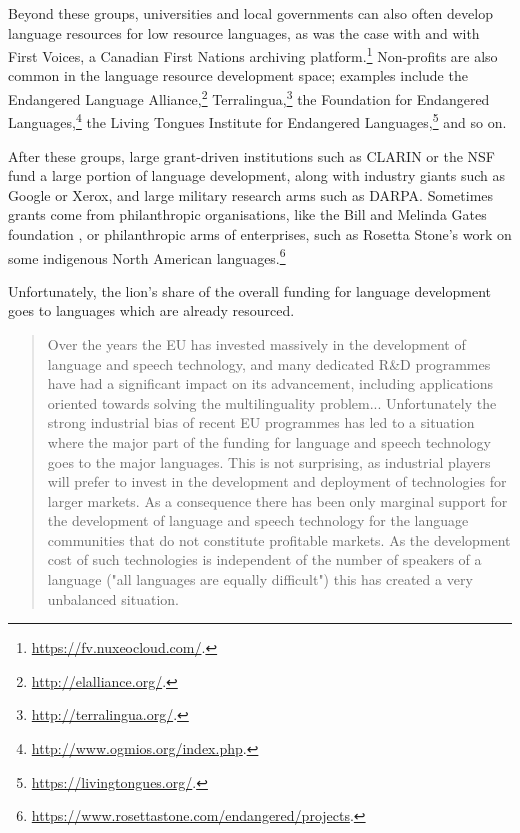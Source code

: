 Beyond these groups, universities and local governments can also often develop language resources for low resource languages, as was the case with \citet{rognvaldsson2009icelandic} and with First Voices, a Canadian First Nations archiving platform.\footnote{\href{https://fv.nuxeocloud.com/}{https://fv.nuxeocloud.com/}. } Non-profits are also common in the language resource development space; examples include the Endangered Language Alliance,\footnote{\href{http://elalliance.org/}{http://elalliance.org/}. } Terralingua,\footnote{\href{http://terralingua.org/}{http://terralingua.org/}. } the Foundation for Endangered Languages,\footnote{\href{http://www.ogmios.org/index.php}{http://www.ogmios.org/index.php}. } the Living Tongues Institute for Endangered Languages,\footnote{\href{https://livingtongues.org/}{https://livingtongues.org/}. } and so on.

After these groups, large grant-driven institutions such as CLARIN or the NSF fund a large portion of language development, along with industry giants such as Google or Xerox, and large military research arms such as DARPA. Sometimes grants come from philanthropic organisations, like the Bill and Melinda Gates foundation \citep{penfield2006technology}, or philanthropic arms of enterprises, such as Rosetta Stone's work on some indigenous North American languages.\footnote{\href{https://www.rosettastone.com/endangered/projects}{https://www.rosettastone.com/endangered/projects}. }

Unfortunately, the lion's share of the overall funding for language development goes to languages which are already resourced.

\begin{quote}
Over the years the EU has invested massively in the development of language and speech technology, and many dedicated R\&D programmes have had a significant impact on its advancement, including applications oriented towards solving the multilinguality problem... Unfortunately the strong industrial bias of recent EU programmes has led to a situation where the major part of the funding for language and speech technology goes to the major languages. This is not surprising, as industrial players will prefer to invest in the development and deployment of technologies for larger markets. As a consequence there has been only marginal support for the development of language and speech technology for the language communities that do not constitute profitable markets. As the development cost of such technologies is independent of the number of speakers of a language ("all languages are equally difficult") this has created a very unbalanced situation. \citep{krauwer2006strengthening}
\end{quote}

